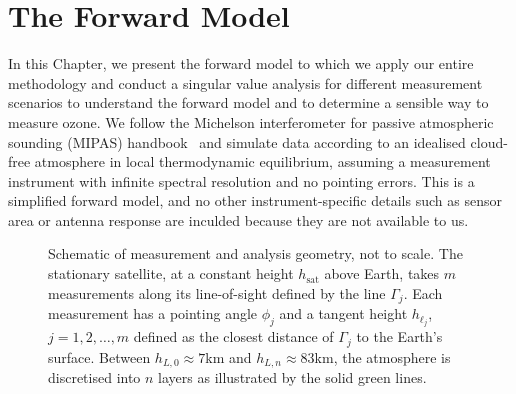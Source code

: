 \chapter{The Forward Model}
\label{ch:formodel}
\thispagestyle{empty}

In this Chapter, we present the forward model to which we apply our entire methodology and conduct a singular value analysis for different measurement scenarios to understand the forward model and to determine a sensible way to measure ozone. We follow the Michelson interferometer for passive atmospheric sounding (MIPAS) handbook~\cite{mipas2000handbook} and simulate data according to an idealised cloud-free atmosphere in local thermodynamic equilibrium, assuming a measurement instrument with infinite spectral resolution and no pointing errors.
This is a simplified forward model, and no other instrument-specific details such as sensor area or antenna response are inculded because they are not available to us. 
\begin{figure}[ht!]
	\centering
	
	\caption[Schematic of measurement and analysis geometry.]{Schematic of measurement and analysis geometry, not to scale.
		The stationary satellite, at a constant height $h_\text{sat}$ above Earth, takes $m$ measurements along its line-of-sight defined by the line $\Gamma_j$.
		Each measurement has a pointing angle $\phi_j$ and a tangent height $h_{\ell_j}$, $j=1,2,\dots,m$ defined as the closest distance of $\Gamma_j$ to the Earth's surface.
		Between $h_{L,0} \approx 7$km and $h_{L,n} \approx 83$km, the atmosphere is discretised into $n$ layers as illustrated by the solid green lines.}
	\label{fig:LIMB}
\end{figure}

